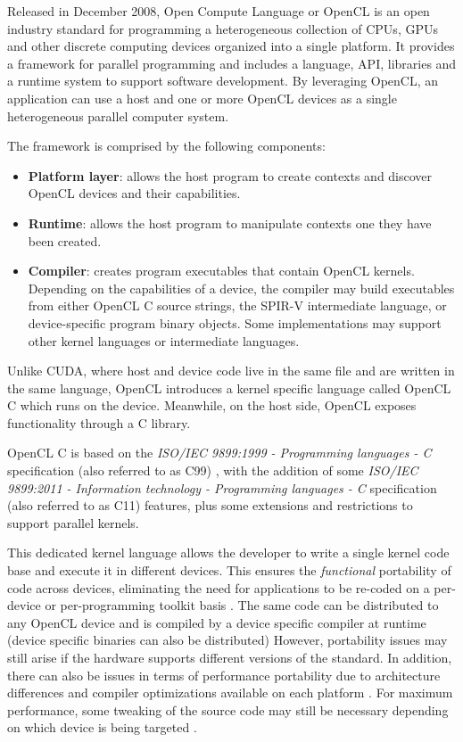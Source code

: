 Released in December 2008, Open Compute Language or OpenCL \cite{opencl_spec} is an open industry standard for programming a heterogeneous collection of CPUs, GPUs and other discrete computing devices organized into a single platform. It provides a framework for parallel programming and includes a language, API, libraries and a runtime system to support software development. By leveraging OpenCL, an application can use a host and one or more OpenCL devices as a single heterogeneous parallel computer system.

The framework is comprised by the following components:
\begin{itemize}
    \item \textbf{Platform layer}: allows the host program to create contexts and discover OpenCL devices and their capabilities.
    \item \textbf{Runtime}: allows the host program to manipulate contexts one they have been created.
    \item \textbf{Compiler}: creates program executables that contain OpenCL kernels. Depending on the capabilities of a device, the compiler may build executables from either OpenCL C source strings, the SPIR-V intermediate language, or device-specific program binary objects. Some implementations may support other kernel languages or intermediate languages.
\end{itemize}

Unlike CUDA, where host and device code live in the same file and are written in the same language, OpenCL introduces a kernel specific language called OpenCL C \cite{opencl_c_spec} which runs on the device. Meanwhile, on the host side, OpenCL exposes functionality through a C library.

OpenCL C is based on the \textit{ISO/IEC 9899:1999 - Programming languages - C} specification (also referred to as C99) \cite{c99}, with the addition of some \textit{ISO/IEC 9899:2011 - Information technology - Programming languages - C} specification (also referred to as C11) \cite{c11} features, plus some extensions and restrictions to support parallel kernels.

This dedicated kernel language allows the developer to write a single kernel code base and execute it in different devices. This ensures the \textit{functional} portability of code across devices, eliminating the need for applications to be re-coded on a per-device or per-programming toolkit basis \cite{performance_portability_2013}. The same code can be distributed to any OpenCL device and is compiled by a device specific compiler at runtime (device specific binaries can also be distributed) However, portability issues may still arise if the hardware supports different versions of the standard. In addition, there can also be issues in terms of performance portability due to architecture differences and compiler optimizations available on each platform \cite{performance_portability_2013, performance_portability_2019, performance_portability_2020}. For maximum performance, some tweaking of the source code may still be necessary depending on which device is being targeted \cite{optimizing_opencl_fpga_integer, optimizing_opencl_fpga_automata}.

